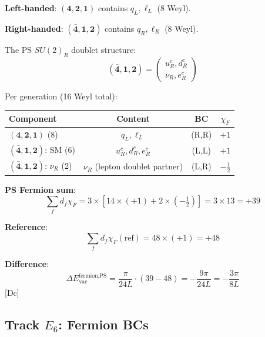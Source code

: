 \documentclass[11pt,a4paper]{article}
\newcommand{\tagDc}{\textcolor{blue!50!black}{[Dc]}}
\begin{document}
\begin{trackbox}
\textbf{Left-handed}: $(\mathbf{4}, \mathbf{2}, \mathbf{1})$ contains $q_L, \ell_L$ (8 Weyl).

\textbf{Right-handed}: $(\bar{\mathbf{4}}, \mathbf{1}, \mathbf{2})$ contains $q_R, \ell_R$ (8 Weyl).

The PS $SU(2)_R$ doublet structure:
\begin{equation}
\label{eq:ps-su2r}
(\bar{\mathbf{4}}, \mathbf{1}, \mathbf{2}) = \begin{pmatrix} u_R^c, d_R^c \\ \nu_R, e_R^c \end{pmatrix}
\end{equation}

Per generation (16 Weyl total):
\begin{center}
\begin{tabular}{lccc}
\toprule
Component & Content & BC & $\chi_F$ \\
\midrule
$(\mathbf{4},\mathbf{2},\mathbf{1})$ (8) & $q_L, \ell_L$ & (R,R) & $+1$ \\
$(\bar{\mathbf{4}},\mathbf{1},\mathbf{2})$: SM (6) & $u_R^c, d_R^c, e_R^c$ & (L,L) & $+1$ \\
$(\bar{\mathbf{4}},\mathbf{1},\mathbf{2})$: $\nu_R$ (2) & $\nu_R$ (lepton doublet partner) & (L,R) & $-\frac{1}{2}$ \\
\bottomrule
\end{tabular}
\end{center}

\textbf{PS Fermion sum}:
\begin{equation}
\label{eq:ps-ferm-sum}
\sum_f d_f \chi_F = 3 \times [14 \times (+1) + 2 \times (-\tfrac{1}{2})] = 3 \times 13 = +39
\end{equation}

\textbf{Reference}:
\begin{equation}
\label{eq:ps-ferm-ref}
\sum_f d_f \chi_F(\text{ref}) = 48 \times (+1) = +48
\end{equation}

\textbf{Difference}:
\begin{equation}
\label{eq:ps-ferm-diff}
\Delta E_{\text{vac}}^{\text{fermion,PS}} = \frac{\pi}{24L} \cdot (39 - 48) = -\frac{9\pi}{24L} = -\frac{3\pi}{8L}
\end{equation}
\tagDc
\end{trackbox}

\subsection{Track $E_6$: Fermion BCs}
\end{document}
